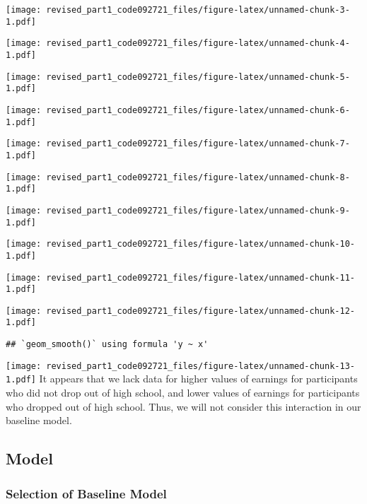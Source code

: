 \documentclass[
]{article}
\begin{document}
\texttt{[image: revised\_part1\_code092721\_files/figure-latex/unnamed-chunk-3-1.pdf]}

\texttt{[image: revised\_part1\_code092721\_files/figure-latex/unnamed-chunk-4-1.pdf]}

\texttt{[image: revised\_part1\_code092721\_files/figure-latex/unnamed-chunk-5-1.pdf]}

\texttt{[image: revised\_part1\_code092721\_files/figure-latex/unnamed-chunk-6-1.pdf]}

\texttt{[image: revised\_part1\_code092721\_files/figure-latex/unnamed-chunk-7-1.pdf]}

\texttt{[image: revised\_part1\_code092721\_files/figure-latex/unnamed-chunk-8-1.pdf]}

\texttt{[image: revised\_part1\_code092721\_files/figure-latex/unnamed-chunk-9-1.pdf]}

\texttt{[image: revised\_part1\_code092721\_files/figure-latex/unnamed-chunk-10-1.pdf]}

\texttt{[image: revised\_part1\_code092721\_files/figure-latex/unnamed-chunk-11-1.pdf]}

\texttt{[image: revised\_part1\_code092721\_files/figure-latex/unnamed-chunk-12-1.pdf]}

\begin{verbatim}
## `geom_smooth()` using formula 'y ~ x'
\end{verbatim}

\texttt{[image: revised\_part1\_code092721\_files/figure-latex/unnamed-chunk-13-1.pdf]}
It appears that we lack data for higher values of earnings for
participants who did not drop out of high school, and lower values of
earnings for participants who dropped out of high school. Thus, we will
not consider this interaction in our baseline model.

\hypertarget{model}{%
\subsection{Model}\label{model}}

\hypertarget{selection-of-baseline-model}{%
\subsubsection{Selection of Baseline
Model}\label{selection-of-baseline-model}}
\end{document}

